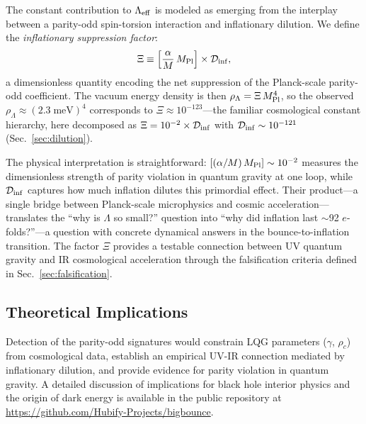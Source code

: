 \documentclass[aps,prd,twocolumn,superscriptaddress,showpacs,preprintnumbers,nofootinbib,longbibliography,floatfix]{revtex4-2}
\newcommand{\Leff}{\Lambda_{\rm eff}}
\newcommand{\Dinf}{\mathcal{D}_{\rm inf}}
\newcommand{\MPl}{M_{\rm Pl}}
\begin{document}
The constant contribution to $\Leff$ is modeled as emerging from the interplay between a parity-odd spin-torsion interaction and inflationary dilution. We define the \textit{inflationary suppression factor}:
\begin{equation}\label{eq:gdp}
\Xi \equiv \left[\frac{\alpha}{M}\,\MPl\right]\times\Dinf,
\end{equation}
a dimensionless quantity encoding the net suppression of the Planck-scale parity-odd coefficient. The vacuum energy density is then $\rho_\Lambda = \Xi\,\MPl^4$, so the observed $\rho_\Lambda \approx (2.3\;\text{meV})^4$ corresponds to $\Xi\approx 10^{-123}$---the familiar cosmological constant hierarchy, here decomposed as $\Xi = 10^{-2}\times\Dinf$ with $\Dinf\sim 10^{-121}$ (Sec.~\ref{sec:dilution}).

The physical interpretation is straightforward: $[(\alpha/M)\,\MPl]\sim 10^{-2}$ measures the dimensionless strength of parity violation in quantum gravity at one loop, while $\Dinf$ captures how much inflation dilutes this primordial effect. Their product---a single bridge between Planck-scale microphysics and cosmic acceleration---translates the ``why is $\Lambda$ so small?'' question into ``why did inflation last $\sim$92 $e$-folds?''---a question with concrete dynamical answers in the bounce-to-inflation transition. The factor $\Xi$ provides a testable connection between UV quantum gravity and IR cosmological acceleration through the falsification criteria defined in Sec.~\ref{sec:falsification}.


\subsection{Theoretical Implications}

Detection of the parity-odd signatures would constrain LQG parameters ($\gamma$, $\rho_c$) from cosmological data, establish an empirical UV-IR connection mediated by inflationary dilution, and provide evidence for parity violation in quantum gravity. A detailed discussion of implications for black hole interior physics and the origin of dark energy is available in the public repository at \url{https://github.com/Hubify-Projects/bigbounce}.

\end{document}
